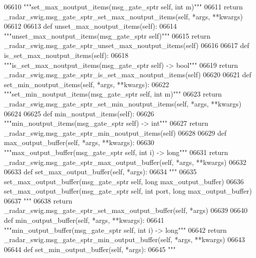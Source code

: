 \begin{DoxyCode}
{{{{{{{{{{{{{{{{{{{{{{06610         \textcolor{stringliteral}{"""set\_max\_noutput\_items(msg\_gate\_sptr self, int m)"""}
06611         \textcolor{keywordflow}{return} \_radar\_swig.msg\_gate\_sptr\_set\_max\_noutput\_items(self, *args, **kwargs)
06612 
06613     \textcolor{keyword}{def }unset_max_noutput_items(self):
06614         \textcolor{stringliteral}{"""unset\_max\_noutput\_items(msg\_gate\_sptr self)"""}
06615         \textcolor{keywordflow}{return} \_radar\_swig.msg\_gate\_sptr\_unset\_max\_noutput\_items(self)
06616 
06617     \textcolor{keyword}{def }is_set_max_noutput_items(self):
06618         \textcolor{stringliteral}{"""is\_set\_max\_noutput\_items(msg\_gate\_sptr self) -> bool"""}
06619         \textcolor{keywordflow}{return} \_radar\_swig.msg\_gate\_sptr\_is\_set\_max\_noutput\_items(self)
06620 
06621     \textcolor{keyword}{def }set_min_noutput_items(self, *args, **kwargs):
06622         \textcolor{stringliteral}{"""set\_min\_noutput\_items(msg\_gate\_sptr self, int m)"""}
06623         \textcolor{keywordflow}{return} \_radar\_swig.msg\_gate\_sptr\_set\_min\_noutput\_items(self, *args, **kwargs)
06624 
06625     \textcolor{keyword}{def }min_noutput_items(self):
06626         \textcolor{stringliteral}{"""min\_noutput\_items(msg\_gate\_sptr self) -> int"""}
06627         \textcolor{keywordflow}{return} \_radar\_swig.msg\_gate\_sptr\_min\_noutput\_items(self)
06628 
06629     \textcolor{keyword}{def }max_output_buffer(self, *args, **kwargs):
06630         \textcolor{stringliteral}{"""max\_output\_buffer(msg\_gate\_sptr self, int i) -> long"""}
06631         \textcolor{keywordflow}{return} \_radar\_swig.msg\_gate\_sptr\_max\_output\_buffer(self, *args, **kwargs)
06632 
06633     \textcolor{keyword}{def }set_max_output_buffer(self, *args):
06634         \textcolor{stringliteral}{"""}
06635 \textcolor{stringliteral}{        set\_max\_output\_buffer(msg\_gate\_sptr self, long max\_output\_buffer)}
06636 \textcolor{stringliteral}{        set\_max\_output\_buffer(msg\_gate\_sptr self, int port, long max\_output\_buffer)}
06637 \textcolor{stringliteral}{        """}
06638         \textcolor{keywordflow}{return} \_radar\_swig.msg\_gate\_sptr\_set\_max\_output\_buffer(self, *args)
06639 
06640     \textcolor{keyword}{def }min_output_buffer(self, *args, **kwargs):
06641         \textcolor{stringliteral}{"""min\_output\_buffer(msg\_gate\_sptr self, int i) -> long"""}
06642         \textcolor{keywordflow}{return} \_radar\_swig.msg\_gate\_sptr\_min\_output\_buffer(self, *args, **kwargs)
06643 
06644     \textcolor{keyword}{def }set_min_output_buffer(self, *args):
06645         \textcolor{stringliteral}{"""}
}}}}}}}}}}}}}}}}}}}}}}
\end{DoxyCode}
